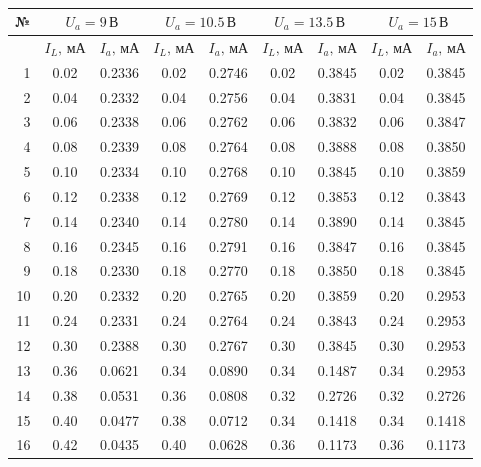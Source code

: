 \documentclass[14pt]{extarticle}
\begin{document}
\begin{table}[ht]
    \centering
    \caption{}
    \begin{tabular}{|r|c|c|c|c|c|c|c|c|}
        \hline
        № & \multicolumn{2}{c|}{$U_a = 9\, \text{В}$} & \multicolumn{2}{c|}{$U_a = 10.5\, \text{В}$} & \multicolumn{2}{c|}{$U_a = 13.5\, \text{В}$} & \multicolumn{2}{c|}{$U_a = 15\, \text{В}$} \\ \hline
         & $I_L,\, \text{мА}$ & $I_a,\, \text{мА}$ & $I_L,\, \text{мА}$ & $I_a,\, \text{мА}$ & $I_L,\, \text{мА}$ & $I_a,\, \text{мА}$ & $I_L,\, \text{мА}$ & $I_a,\, \text{мА}$ \\ \hline
        1  & 0.02 & 0.2336 & 0.02 & 0.2746 & 0.02 & 0.3845 & 0.02 & 0.3845 \\ \hline
        2  & 0.04 & 0.2332 & 0.04 & 0.2756 & 0.04 & 0.3831 & 0.04 & 0.3845 \\ \hline
        3  & 0.06 & 0.2338 & 0.06 & 0.2762 & 0.06 & 0.3832 & 0.06 & 0.3847 \\ \hline
        4  & 0.08 & 0.2339 & 0.08 & 0.2764 & 0.08 & 0.3888 & 0.08 & 0.3850 \\ \hline
        5  & 0.10 & 0.2334 & 0.10 & 0.2768 & 0.10 & 0.3845 & 0.10 & 0.3859 \\ \hline
        6  & 0.12 & 0.2338 & 0.12 & 0.2769 & 0.12 & 0.3853 & 0.12 & 0.3843 \\ \hline
        7  & 0.14 & 0.2340 & 0.14 & 0.2780 & 0.14 & 0.3890 & 0.14 & 0.3845 \\ \hline
        8  & 0.16 & 0.2345 & 0.16 & 0.2791 & 0.16 & 0.3847 & 0.16 & 0.3845 \\ \hline
        9  & 0.18 & 0.2330 & 0.18 & 0.2770 & 0.18 & 0.3850 & 0.18 & 0.3845 \\ \hline
        10 & 0.20 & 0.2332 & 0.20 & 0.2765 & 0.20 & 0.3859 & 0.20 & 0.2953 \\ \hline
        11 & 0.24 & 0.2331 & 0.24 & 0.2764 & 0.24 & 0.3843 & 0.24 & 0.2953 \\ \hline
        12 & 0.30 & 0.2388 & 0.30 & 0.2767 & 0.30 & 0.3845 & 0.30 & 0.2953 \\ \hline
        13 & 0.36 & 0.0621 & 0.34 & 0.0890 & 0.34 & 0.1487 & 0.34 & 0.2953 \\ \hline
        14 & 0.38 & 0.0531 & 0.36 & 0.0808 & 0.32 & 0.2726 & 0.32 & 0.2726 \\ \hline
        15 & 0.40 & 0.0477 & 0.38 & 0.0712 & 0.34 & 0.1418 & 0.34 & 0.1418 \\ \hline
        16 & 0.42 & 0.0435 & 0.40 & 0.0628 & 0.36 & 0.1173 & 0.36 & 0.1173 \\ \hline

\end{tabular}
\end{table}
\end{document}
